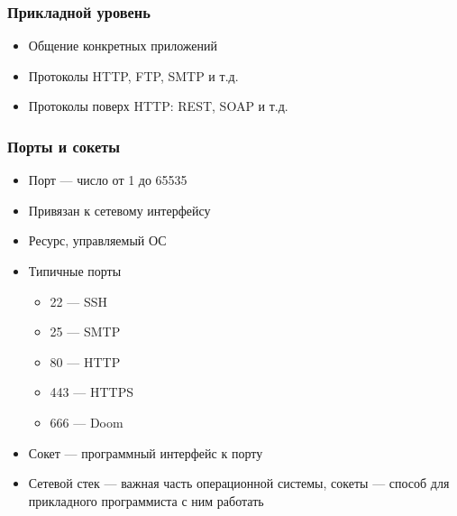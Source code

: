 \documentclass[xetex,mathserif,serif]{beamer}
\begin{document}
	\begin{frame}
		\frametitle{Прикладной уровень}
		\begin{itemize}
			\item Общение конкретных приложений
			\item Протоколы HTTP, FTP, SMTP и т.д.
			\item Протоколы поверх HTTP: REST, SOAP и т.д.
		\end{itemize}
	\end{frame}

	\begin{frame}
		\frametitle{Порты и сокеты}
		\begin{itemize}
			\item Порт --- число от 1 до 65535
			\item Привязан к сетевому интерфейсу
			\item Ресурс, управляемый ОС
			\item Типичные порты
			\begin{itemize}
				\item 22 --- SSH
				\item 25 --- SMTP
				\item 80 --- HTTP
				\item 443 --- HTTPS
				\item 666 --- Doom
			\end{itemize}
			\item Сокет --- программный интерфейс к порту
			\item Сетевой стек --- важная часть операционной системы, сокеты --- способ для прикладного программиста с ним работать
		\end{itemize}
	\end{frame}
\end{document}
